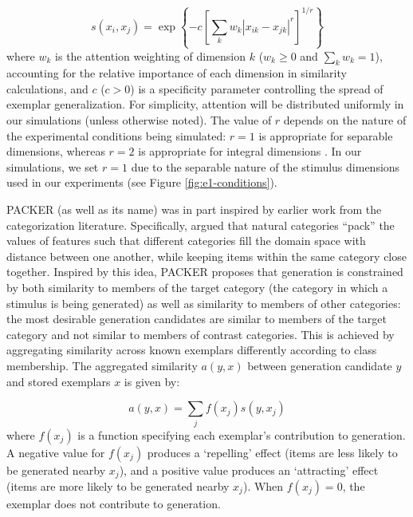 \documentclass[12pt]{article}
\begin{document}
\begin{flushleft}
\begin{equation}
s\left(x_i,x_j\right) = \exp \left\{ -c \left[\sum_{k}{ w_k \left| x_{ik} - x_{jk} \right|^r }\right]^{1/r} \right\}
\label{eq:similarity}
\end{equation}
% 
where $w_k$ is the attention weighting of dimension $k$ ($w_k \geq 0$ and $\sum_k{w_k} = 1$), accounting for the relative importance of each dimension in similarity calculations, and $c$ ($c>0$) is a specificity parameter controlling the spread of exemplar generalization. For simplicity, attention will be distributed uniformly in our simulations (unless otherwise noted). The value of $r$ depends on the nature of the experimental conditions being simulated: $r=1$ is appropriate for separable dimensions, whereas $r=2$ is appropriate for integral dimensions \citep[e.g.,][]{shepard1964attention,garner1974processing}. In our simulations, we set $r=1$ due to the separable nature of the stimulus dimensions used in our experiments (see Figure \ref{fig:e1-conditions}).

PACKER (as well as its name) was in part inspired by earlier work from the categorization literature. Specifically, \cite{hidaka2011packing} argued that natural categories ``pack'' the values of features such that different categories fill the domain space with distance between one another, while keeping items within the same category close together. Inspired by this idea, PACKER proposes that generation is constrained by both similarity to members of the target category (the category in which a stimulus is being generated) as well as similarity to members of other categories: the most desirable generation candidates are similar to members of the target category and not similar to members of contrast categories. This is achieved by aggregating similarity across known exemplars differently according to class membership. The aggregated similarity $a(y,x)$ between generation candidate $y$ and stored exemplars $x$ is given by:

\begin{equation}
a(y, x) = \sum_j{f(x_j) s(y, x_j)}
\end{equation}
% 
where $f(x_j)$ is a function specifying each exemplar's contribution to generation. A negative value for $f(x_j)$ produces a `repelling' effect (items are less likely to be generated nearby $x_j$), and a positive value produces an `attracting' effect (items are more likely to be generated nearby $x_j$). When $f(x_j)=0$, the exemplar does not contribute to generation. 


\end{flushleft}
\end{document}
